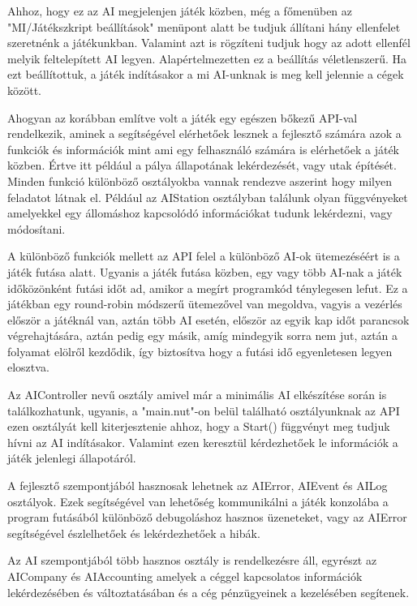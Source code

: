 Ahhoz, hogy ez az AI megjelenjen játék közben, még a főmenüben az "MI/Játékszkript beállítások" menüpont alatt be tudjuk állítani hány ellenfelet szeretnénk a játékunkban. Valamint azt is rögzíteni tudjuk hogy az adott ellenfél melyik feltelepített AI legyen. Alapértelmezetten ez a beállítás véletlenszerű. Ha ezt beállítottuk, a játék indításakor a mi AI-unknak is meg kell jelennie a cégek között.



Ahogyan az korábban említve volt a játék egy egészen bőkezű API-val rendelkezik, aminek a segítségével elérhetőek lesznek a fejlesztő számára azok a funkciók és információk mint ami egy felhasználó számára is elérhetőek a játék közben. Értve itt például a pálya állapotának lekérdezését, vagy utak építését. Minden funkció különböző osztályokba vannak rendezve aszerint hogy milyen feladatot látnak el. Például az AIStation osztályban találunk olyan függvényeket amelyekkel egy állomáshoz kapcsolódó információkat tudunk lekérdezni, vagy módosítani.

A különböző funkciók mellett az API felel a különböző AI-ok ütemezéséért is a játék futása alatt. Ugyanis a játék futása közben, egy vagy több AI-nak a játék időközönként futási időt ad, amikor a megírt programkód ténylegesen lefut. Ez a játékban egy round-robin módszerű ütemezővel van megoldva, vagyis a vezérlés először a játéknál van, aztán több AI esetén, először az egyik kap időt parancsok végrehajtására, aztán pedig egy másik, amíg mindegyik sorra nem jut, aztán a folyamat elölről kezdődik, így biztosítva hogy a futási idő egyenletesen legyen elosztva. 

Az AIController nevű osztály amivel már a minimális AI elkészítése során is találkozhatunk, ugyanis, a "main.nut"-on belül található osztályunknak az API ezen osztályát kell kiterjesztenie ahhoz, hogy a Start() függvényt meg tudjuk hívni az AI indításakor. Valamint ezen keresztül kérdezhetőek le információk a játék jelenlegi állapotáról.

A fejlesztő szempontjából hasznosak lehetnek az AIError, AIEvent és AILog osztályok. Ezek segítségével van lehetőség kommunikálni a játék konzolába a program futásából különböző debugoláshoz hasznos üzeneteket, vagy az AIError segítségével észlelhetőek és lekérdezhetőek a hibák.

Az AI szempontjából több hasznos osztály is rendelkezésre áll, egyrészt az AICompany és AIAccounting amelyek a céggel kapcsolatos információk lekérdezésében és változtatásában és a cég pénzügyeinek a kezelésében segítenek.


